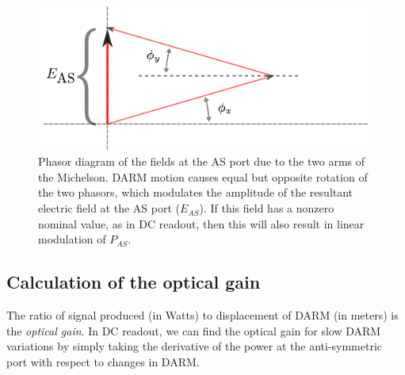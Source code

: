 \begin{figure}[p]
\includegraphics[width=\columnwidth]{figures/phasors.pdf}
\caption[Phasor diagram of DC readout]{\label{fig:mich-phasors}Phasor
  diagram of the fields at the AS port due to the two arms of the
  Michelson.  DARM motion causes equal but opposite rotation of the
  two phasors, which modulates the amplitude of the resultant electric
  field at the AS port ($E_{AS}$).  If this field has a nonzero
  nominal value, as in DC readout, then this will also result in
  linear modulation of $P_{AS}$.}
\end{figure}

\subsection{Calculation of the optical gain}

The ratio of signal produced (in Watts) to displacement of DARM (in
meters) is the \emph{optical gain}.  In DC readout, we can find the
optical gain for slow DARM variations by simply taking the derivative
of the power at the anti-symmetric port with respect to changes in
DARM.

